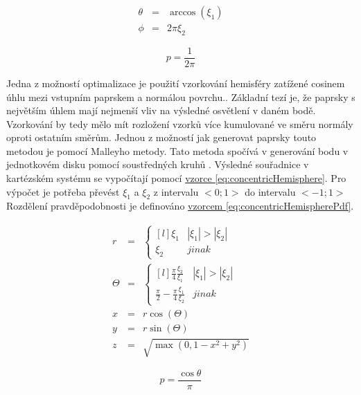 \documentclass[czech,master,dept460,male,cpp,cpdeclaration]{diploma}
\newcommand{\randU}{\xi_{1}}
\newcommand{\randV}{\xi_{2}}
\begin{document}
\begin{eqnarray}
    \theta & = & \arccos(\randU) \nonumber \\
    \phi & = & 2\pi\randV \label{eq:hemisphereSampling}
\end{eqnarray}

\begin{equation} \label{eq:hemisphereSamplingPdf}
    p = \frac{1}{2\pi}
\end{equation}

Jedna z možností optimalizace je použití vzorkování hemisféry zatížené cosinem úhlu mezi vstupním paprskem a normálou povrchu.. Základní tezí je, že paprsky s největším úhlem mají nejmenší vliv na výsledné osvětlení v daném bodě. Vzorkování by tedy mělo mít rozložení vzorků více kumulované ve směru normály oproti ostatním směrům. Jednou z možností jak generovat paprsky touto metodou je pomocí Malleyho metody. Tato metoda spočívá v generování bodu v jednotkovém disku pomocí soustředných kruhů \cite{PHARR2017747}. Výsledné souřadnice v kartézském systému se vypočítají pomocí \hyperref[eq:concentricHemisphere]{vzorce \ref{eq:concentricHemisphere}}. Pro výpočet je potřeba převést $\randU$ a $\randV$ z intervalu $<0;1>$ do intervalu $<-1;1>$  Rozdělení pravděpodobnosti je definováno \hyperref[eq:concentricHemisphere]{vzorcem \ref{eq:concentricHemispherePdf}}.

\begin{eqnarray}
    r & = & \left\{\begin{matrix*}[l] \randU & |\randU| > \left | \randV \right |\\ \randV & jinak \end{matrix*}\right. \nonumber \\
    \Theta & = & \left\{\begin{matrix*}[l] \frac{\pi}{4}\frac{\randV}{\randU} & |\randU| > \left | \randV \right |\\ \frac{\pi}{2}-\frac{\pi}{4}\frac{\randU}{\randV} & jinak \end{matrix*}\right. \nonumber \\
    x & = &r\cos(\Theta)\nonumber \\
    y & = &r\sin(\Theta)\nonumber \\
    z & = &\sqrt{ \max(0, 1 - x^2 + y^2) }\label{eq:concentricHemisphere}
\end{eqnarray}

\begin{equation} \label{eq:concentricHemispherePdf}
    p = \frac{\cos\theta}{\pi}
\end{equation}
\end{document}
